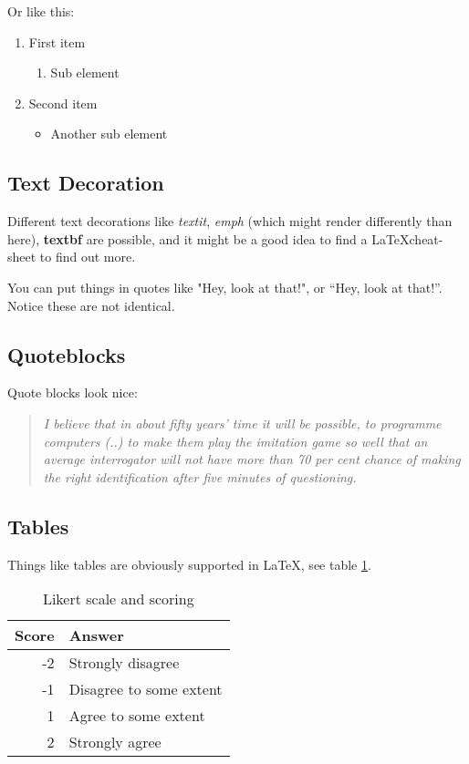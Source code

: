 \documentclass[a4paper, twocolumn]{article}
\begin{document}
Or like this:

\begin{enumerate}
    \item First item
        \begin{enumerate}
            \item Sub element
        \end{enumerate}
    \item Second item
        \begin{itemize}
            \item Another sub element
        \end{itemize}
\end{enumerate}


\subsection{Text Decoration\label{sec:Text Decoration}}


Different text decorations like \textit{textit}, \emph{emph} (which might render differently than here), \textbf{textbf} are possible, and it might be a good idea to find a \LaTeX cheat-sheet to find out more.

You can put things in quotes like "Hey, look at that!", or ``Hey, look at that!''.
Notice these are not identical.


\subsection{Quoteblocks\label{sec:Quoteblock}}

Quote blocks look nice:

\begin{quote}
\emph{
I believe that in about fifty years' time it will be possible, to programme computers (..) to make them play the imitation game so well that an average interrogator will not have more than 70 per cent chance of making the right identification after five minutes of questioning.
}
\cite{turing1950computing}
\end{quote}


\subsection{Tables\label{sec:Tables}}

Things like tables are obviously supported in \LaTeX, see table \ref{table:Likert scale and scoring}.

\begin{table}[ht]
    \caption{Likert scale and scoring}
    \centering
    \begin{tabular}{r | l}
        \hline\hline
        Score & Answer \\ [0.5ex] %
        \hline
        -2 & Strongly disagree \\
        -1 & Disagree to some extent \\
        1 & Agree to some extent \\
        2 & Strongly agree \\ [1ex]
        \hline
    \end{tabular}
    \label{table:Likert scale and scoring}
\end{table}
\end{document}
